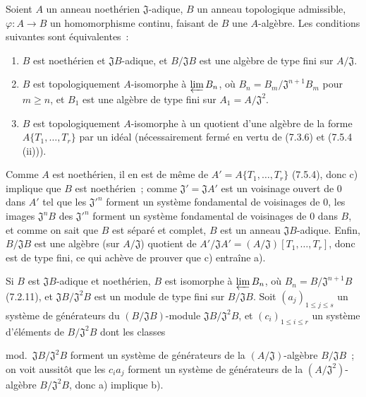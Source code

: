 \begin{proposition}[7.5.5]
\label{0.7.5.5-fr}
Soient $A$ un anneau noethérien $\mathfrak J$-adique, $B$ un anneau topologique
admissible, $\varphi:A\to B$ un homomorphisme continu, faisant de $B$ une
$A$-algèbre. Les conditions suivantes sont équivalentes~:
\begin{enumerate}
  \item[a)] $B$ est noethérien et $\mathfrak JB$-adique, et
  $B/\mathfrak JB$ est une algèbre de type fini sur $A/\mathfrak J$.

  \item[b)] $B$ est topologiquement $A$-isomorphe à $\varprojlim B_n$, où
  $B_n=B_m/\mathfrak J^{n+1}B_m$ pour $m\geq n$, et $B_1$ est une algèbre de
  type fini sur $A_1=A/\mathfrak J^2$.

  \item[c)] $B$ est topologiquement $A$-isomorphe à un quotient d'une algèbre
  de la forme\linebreak $A\{T_1,\ldots,T_r\}$ par un idéal (nécessairement fermé en vertu
  de (7.3.6) et (7.5.4 (ii))).
\end{enumerate}
\end{proposition}

Comme $A$ est noethérien, il en est de même de
$A'=A\{T_1,\ldots,T_r\}$ (7.5.4), donc c) implique que $B$ est noethérien~;
comme $\mathfrak J'=\mathfrak JA'$ est un voisinage ouvert de 0 dans $A'$ tel
que les $\mathfrak J'^{n}$ forment un système fondamental de voisinages de 0,
les images $\mathfrak J^nB$ des $\mathfrak J'^{n}$ forment un système
fondamental de voisinages de 0 dans $B$, et comme on sait que $B$ est séparé et
complet, $B$ est un anneau $\mathfrak JB$-adique. Enfin, $B/\mathfrak JB$ est
une algèbre (sur $A/\mathfrak J$) quotient de
$A'/\mathfrak JA'=(A/\mathfrak J)[T_1,\ldots,T_r]$, donc est de type fini, ce
qui achève de prouver que c) entraîne a).

Si $B$ est $\mathfrak JB$-adique et noethérien, $B$ est isomorphe à
$\varprojlim B_n$, où $B_n=B/\mathfrak J^{n+1}B$ (7.2.11), et
$\mathfrak JB/\mathfrak J^2B$ est un module de type fini sur
$B/\mathfrak JB$. Soit $(a_j)_{1\leq j\leq s}$ un système de générateurs du
$(B/\mathfrak JB)$-module $\mathfrak JB/\mathfrak J^2B$, et
$(c_i)_{1\leq i\leq r}$ un système d'éléments de $B/\mathfrak J^2B$ dont les
classes


mod.~$\mathfrak JB/\mathfrak J^2B$ forment un système de générateurs de la
$(A/\mathfrak J)$-algèbre $B/\mathfrak JB$~; on voit aussitôt que les $c_ia_j$
forment un système de générateurs de la $(A/\mathfrak J^2)$-algèbre
$B/\mathfrak J^2B$, donc a) implique b).


